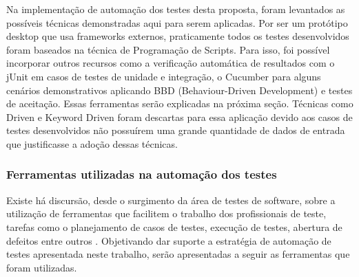 Na implementação de automação dos testes desta proposta, foram levantados as possíveis técnicas demonstradas aqui para serem aplicadas. Por ser um protótipo desktop que usa frameworks externos, praticamente todos os testes desenvolvidos foram baseados na técnica de Programação de Scripts. Para isso, foi possível incorporar outros recursos como a verificação automática de resultados com o jUnit em casos de testes de unidade e integração, o Cucumber para alguns cenários demonstrativos aplicando BBD (Behaviour-Driven Development) e testes de aceitação. Essas ferramentas serão explicadas na próxima seção. Técnicas como Driven e Keyword Driven foram descartas para essa aplicação devido aos casos de testes desenvolvidos não possuírem uma grande quantidade de dados de entrada que justificasse a adoção dessas técnicas.

\subsubsection{Ferramentas utilizadas na automação dos testes}

Existe há discursão, desde o surgimento da área de testes de software, sobre a utilização de ferramentas que facilitem o trabalho dos profissionais de teste, tarefas como o planejamento de casos de testes, execução de testes, abertura de defeitos entre outros \cite{Solis2011}. Objetivando dar suporte a estratégia  de automação de testes apresentada neste trabalho, serão apresentadas a seguir as ferramentas que foram utilizadas.

